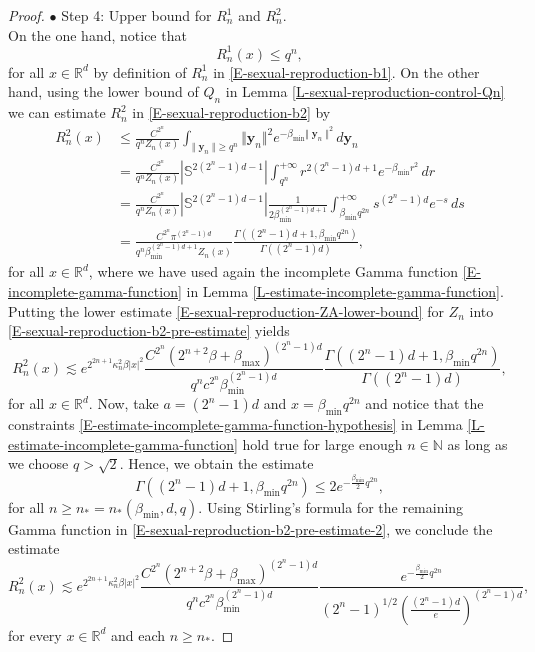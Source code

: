 \documentclass[reqno]{amsart}
\DeclareMathOperator{\by}{\mathbf{y}}
\numberwithin{equation}{section}
\begin{document}
{\begin{proof}
$\bullet$ {\sc Step 4}: Upper bound for $R_n^1$ and $R_n^2$.\\
On the one hand, notice that 
\begin{equation}\label{E-sexual-reproduction-b1-estimate}
R_n^1(x)\leq q^n,
\end{equation}
for all $x\in \mathbb{R}^d$ by definition of $R_n^1$ in \eqref{E-sexual-reproduction-b1}. On the other hand, using the lower bound of $Q_n$ in Lemma \ref{L-sexual-reproduction-control-Qn} we can estimate $R_n^2$ in \eqref{E-sexual-reproduction-b2} by
\begin{align}
R_n^2(x)&\leq \frac{C^{2^n}}{q^n Z_n(x)}\int_{\Vert \by_n\Vert\geq q^n}\Vert\mathbf{y}_n\Vert^2e^{-\beta_{\min}\Vert \by_n\Vert^2}\,d\mathbf{y}_n\nonumber\\
&=\frac{C^{2^n}}{q^n Z_n(x)}\left\vert \mathbb{S}^{2(2^n-1)d-1}\right\vert\int_{q^n}^{+\infty} r^{2(2^n-1)d+1}e^{-\beta_{\min} r^2}\,dr\nonumber\\
&=\frac{C^{2^n}}{q^n Z_n(x)}\left\vert \mathbb{S}^{2(2^n-1)d-1}\right\vert\frac{1}{2\beta_{\min}^{(2^n-1)d+1}}\int_{\beta_{\min}q^{2n}}^{+\infty} s^{(2^n-1)d}e^{-s}\,ds\nonumber\\
&=\frac{C^{2^n}\pi^{(2^n-1)d}}{q^n \beta_{\min}^{(2^n-1)d+1} Z_n(x)}\frac{\Gamma\left((2^n-1)d+1,\beta_{\min}q^{2n}\right)}{\Gamma((2^n-1)d)},\label{E-sexual-reproduction-b2-pre-estimate}
\end{align}
for all $x\in \mathbb{R}^d$, where we have used again the  incomplete Gamma function \eqref{E-incomplete-gamma-function} in Lemma \ref{L-estimate-incomplete-gamma-function}. Putting the lower estimate \eqref{E-sexual-reproduction-ZA-lower-bound} for $Z_n$ into \eqref{E-sexual-reproduction-b2-pre-estimate} yields
\begin{equation}\label{E-sexual-reproduction-b2-pre-estimate-2}
R_n^2(x)\lesssim e^{2^{2n+1}\kappa_n^2\beta \vert x\vert^2}\frac{C^{2^n} (2^{n+2}\beta+\beta_{\max})^{(2^n-1)d}}{q^n c^{2^n}\beta_{\min}^{(2^n-1)d}}\frac{\Gamma\left((2^n-1)d+1,\beta_{\min}q^{2n}\right)}{\Gamma((2^n-1)d)},
\end{equation}
for all $x\in \mathbb{R}^d$. Now, take $a=(2^n-1)d$ and $x=\beta_{\min}q^{2n}$ and notice that the constraints \eqref{E-estimate-incomplete-gamma-function-hypothesis} in Lemma \ref{L-estimate-incomplete-gamma-function} hold true for large enough $n\in \mathbb{N}$ as long as we choose $q>\sqrt{2}$. Hence, we obtain the estimate
$$\Gamma\left((2^n-1)d+1,\beta_{\min}q^{2n}\right)\leq 2e^{-\frac{\beta_{\min}}{2}q^{2n}},$$
for all $n\geq n_*=n_*(\beta_{\min},d,q)$. Using Stirling's formula for the remaining Gamma function in \eqref{E-sexual-reproduction-b2-pre-estimate-2}, we conclude the estimate
\begin{equation}\label{E-sexual-reproduction-b2-estimate}
R_n^2(x)\lesssim e^{2^{2n+1}\kappa_n^2\beta \vert x\vert^2}\frac{C^{2^n} (2^{n+2}\beta+\beta_{\max})^{(2^n-1)d}}{q^n c^{2^n}\beta_{\min}^{(2^n-1)d}}\frac{e^{-\frac{\beta_{\min}}{2}q^{2n}}}{(2^n-1)^{1/2} \left(\frac{(2^n-1)d}{e}\right)^{(2^n-1)d}},
\end{equation}
for every $x\in \mathbb{R}^d$ and each $n\geq n_*$.



\end{proof}}
\end{document}
